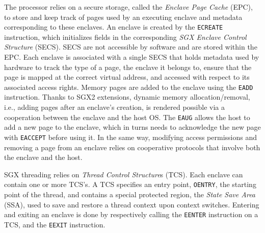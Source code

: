 The processor relies on a secure storage, called the \emph{Enclave Page Cache} (EPC), to store and keep track of pages used by an executing enclave and metadata corresponding to these enclaves.
An enclave is created by the \lstinline{ECREATE} instruction, which initializes fields in the corresponding \emph{SGX Enclave Control Structure} (SECS).
SECS are not accessible by software and are stored within the EPC.
Each enclave is associated with a single SECS that holds metadata used by hardware to track the type of a page, the enclave it belongs to, ensure that the page is mapped at the correct virtual address, and accessed with respect to its associated access rights.
Memory pages are added to the enclave using the \lstinline{EADD} instruction.
Thanks to SGX2 extensions, dynamic memory allocation/removal, i.e., adding pages after an enclave's creation, is rendered possible via a cooperation between the enclave and the host OS.
The \lstinline{EAUG} allows the host to add a new page to the enclave, which in turns needs to acknowledge the new page with \lstinline{EACCEPT} before using it.
In the same way, modifying access permissions and removing a page from an enclave relies on cooperative protocols that involve both the enclave and the host.

SGX threading relies on \emph{Thread Control Structure}s (TCS).
Each enclave can contain one or more TCS's.
A TCS specifies an entry point, \lstinline{OENTRY}, the starting point of the thread, and contains a special protected region, the \emph{State Save Area} (SSA), used to save and restore a thread context upon context switches.
Entering and exiting an enclave is done by respectively calling the \lstinline{EENTER} instruction on a TCS, and the \lstinline{EEXIT} instruction.

